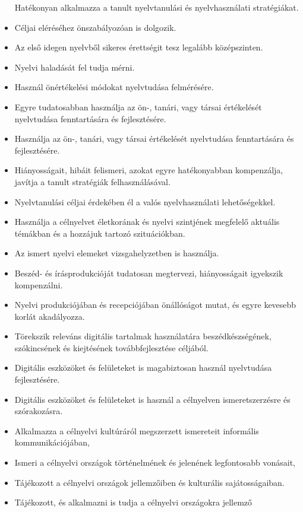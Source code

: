 \begin{itemize}
  Hatékonyan alkalmazza a tanult nyelvtanulási és nyelvhasználati
  stratégiákat.
\item
  Céljai eléréséhez önszabályozóan is dolgozik.
\item
  Az első idegen nyelvből sikeres érettségit tesz legalább középszinten.
\item
  Nyelvi haladását fel tudja mérni.
\item
  Használ önértékelési módokat nyelvtudása felmérésére.
\item
  Egyre tudatosabban használja az ön-, tanári, vagy társai értékelését
  nyelvtudása fenntartására és fejlesztésére.
\item
  Használja az ön-, tanári, vagy társai értékelését nyelvtudása
  fenntartására és fejlesztésére.
\item
  Hiányosságait, hibáit felismeri, azokat egyre hatékonyabban
  kompenzálja, javítja a tanult stratégiák felhasználásával.
\item
  Nyelvtanulási céljai érdekében él a valós nyelvhasználati
  lehetőségekkel.
\item
  Használja a célnyelvet életkorának és nyelvi szintjének megfelelő
  aktuális témákban és a hozzájuk tartozó szituációkban.
\item
  Az ismert nyelvi elemeket vizsgahelyzetben is használja.
\item
  Beszéd- és írásprodukcióját tudatosan megtervezi, hiányosságait
  igyekszik kompenzálni.
\item
  Nyelvi produkciójában és recepciójában önállóságot mutat, és egyre
  kevesebb korlát akadályozza.
\item
  Törekszik releváns digitális tartalmak használatára beszédkészségének,
  szókincsének és kiejtésének továbbfejlesztése céljából.
\item
  Digitális eszközöket és felületeket is magabiztosan használ
  nyelvtudása fejlesztésére.
\item
  Digitális eszközöket és felületeket is használ a célnyelven
  ismeretszerzésre és szórakozásra.
\item
  Alkalmazza a célnyelvi kultúráról megszerzett ismereteit informális
  kommunikációjában,
\item
  Ismeri a célnyelvi országok történelmének és jelenének legfontosabb
  vonásait,
\item
  Tájékozott a célnyelvi országok jellemzőiben és kulturális
  sajátosságaiban.
\item
  Tájékozott, és alkalmazni is tudja a célnyelvi országokra jellemző

\end{itemize}
